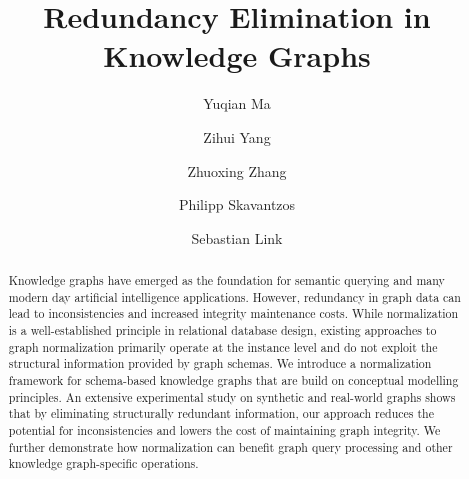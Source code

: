 \documentclass[sigconf]{acmart}
\begin{document}
\title{Redundancy Elimination in Knowledge Graphs}

\author{Yuqian Ma}
\orcid{}

\author{Zihui Yang}
\orcid{}

\author{Zhuoxing Zhang}
\orcid{}

\author{Philipp Skavantzos}
\orcid{}

\author{Sebastian Link}
\correspondingauthor




\begin{abstract}
Knowledge graphs have emerged as the foundation for semantic querying and many modern day artificial intelligence applications. However, redundancy in graph data can lead to inconsistencies and increased integrity maintenance costs. While normalization is a well-established principle in relational database design, existing approaches to graph normalization primarily operate at the instance level and do not exploit the structural information provided by graph schemas. We introduce a normalization framework for schema-based knowledge graphs that are build on conceptual modelling principles. An extensive experimental study on synthetic and real-world graphs shows that by eliminating structurally redundant information, our approach reduces the potential for inconsistencies and lowers the cost of maintaining graph integrity. We further demonstrate how normalization can benefit graph query processing and other knowledge graph-specific operations.
\end{abstract}
\end{document}
